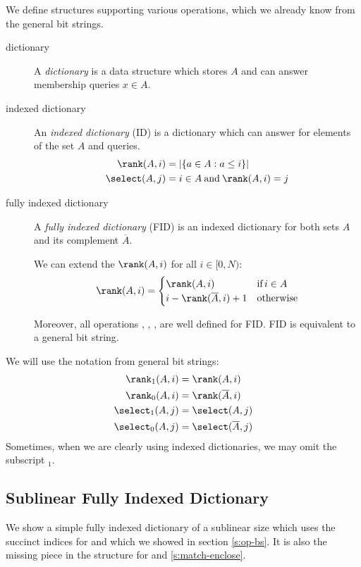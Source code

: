 We define structures supporting various operations, which we already know from the general bit strings.
\begin{description}
	\item[dictionary]
	A \emph{dictionary} is a data structure which stores $A$ and can answer membership queries $x \in A$.
	
	\item[indexed dictionary]
	An \emph{indexed dictionary} (ID) is a dictionary which can answer \rank{} for elements of the set $A$ and \select{} queries.
	\begin{align*}
		\rank(A, i) &= |\{ a \in A : a \le i \}| \\
		\select(A, j) &= i \in A \booland \rank(A, i) = j \\
	\end{align*}
	
	\item[fully indexed dictionary]
	A \emph{fully indexed dictionary} (FID) is an indexed dictionary for both sets $A$ and its complement $\overline{A}$.
	
	We can extend the $\rank(A, i)$ for all $i \in [0, N)$:
	$$ \rank(A, i) = \begin{cases}
		\rank(A, i) & \textif i \in A \\
		i - \rank(\overline{A}, i) + 1 & \textotherwise
	\end{cases}$$
	
	Moreover, all operations \pred{}, \succ{}, \prev{}, \next{} are well defined for FID.
	FID is equivalent to a general bit string.
\end{description}

We will use the notation from general bit strings:
\begin{align*}
	\rank_1(A, i) &= \rank(A, i) \\
	\rank_0(A, i) &= \rank(\overline{A}, i) \\
	\select_1(A, j) &= \select(A, j) \\
	\select_0(A, j) &= \select(\overline{A}, j) \\
\end{align*}
Sometimes, when we are clearly using indexed dictionaries, we may omit the subscript $_1$.

\subsection{Sublinear Fully Indexed Dictionary}

We show a simple fully indexed dictionary of a sublinear size which uses the succinct indices for \rank{} and \select{} which we showed in section \ref{s:op-bs}.
It is also the missing piece in the structure for \match{} and \enclose{} \ref{s:match-enclose}.


